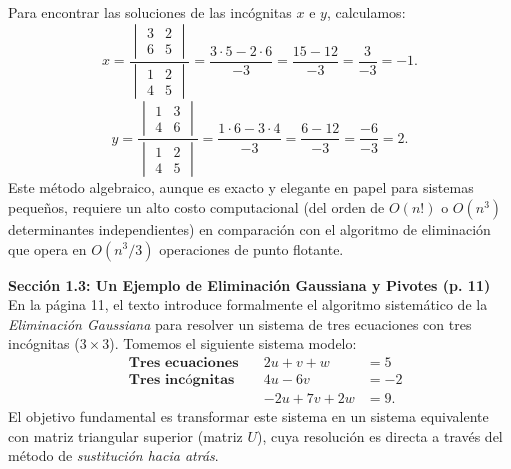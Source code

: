 \documentclass[11pt, a4paper]{article}
\begin{document}
\begin{enumerate}
    Para encontrar las soluciones de las incógnitas $x$ e $y$, calculamos:
    \begin{equation}
    x = \frac{\begin{vmatrix} 3 & 2 \\ 6 & 5 \end{vmatrix}}{\begin{vmatrix} 1 & 2 \\ 4 & 5 \end{vmatrix}} = \frac{3 \cdot 5 - 2 \cdot 6}{-3} = \frac{15 - 12}{-3} = \frac{3}{-3} = -1.
    \end{equation}
    \begin{equation}
    y = \frac{\begin{vmatrix} 1 & 3 \\ 4 & 6 \end{vmatrix}}{\begin{vmatrix} 1 & 2 \\ 4 & 5 \end{vmatrix}} = \frac{1 \cdot 6 - 3 \cdot 4}{-3} = \frac{6 - 12}{-3} = \frac{-6}{-3} = 2.
    \end{equation}
    Este método algebraico, aunque es exacto y elegante en papel para sistemas pequeños, requiere un alto costo computacional (del orden de $O(n!)$ o $O(n^3)$ determinantes independientes) en comparación con el algoritmo de eliminación que opera en $O(n^3/3)$ operaciones de punto flotante.
\end{enumerate}

\noindent\textbf{Sección 1.3: Un Ejemplo de Eliminación Gaussiana y Pivotes (p. 11)}\\[0.5em]
En la página 11, el texto introduce formalmente el algoritmo sistemático de la \textit{Eliminación Gaussiana} para resolver un sistema de tres ecuaciones con tres incógnitas ($3 \times 3$). Tomemos el siguiente sistema modelo:
\begin{equation}
\begin{aligned}
  &\textbf{Tres ecuaciones} \quad & 2u + v + w &= 5 \\
  &\textbf{Tres incógnitas}  \quad & 4u - 6v \phantom{+ 0w} &= -2 \\
  &                          \quad & -2u + 7v + 2w &= 9.
\end{aligned}
\end{equation}
El objetivo fundamental es transformar este sistema en un sistema equivalente con matriz triangular superior (matriz $U$), cuya resolución es directa a través del método de \textit{sustitución hacia atrás}.
\end{document}
